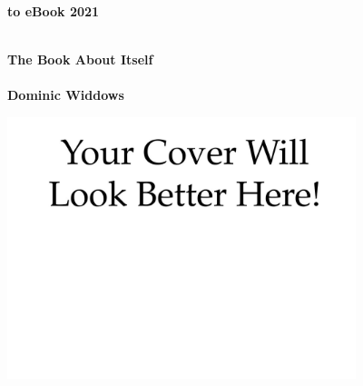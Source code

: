 
\thispagestyle{empty}

\vspace{3cm}
  \begin{center}
	\bfseries \Huge \latex to eBook 2021 \par   %
        ~\\
	\bfseries \LARGE The Book About Itself \\   %
        ~\\
        \bfseries \Large Dominic Widdows \par   %

        \vspace{3cm}
    
	\includegraphics[width=4in]{images/cover.jpg}
    \end{center}
    
\par

\newpage

